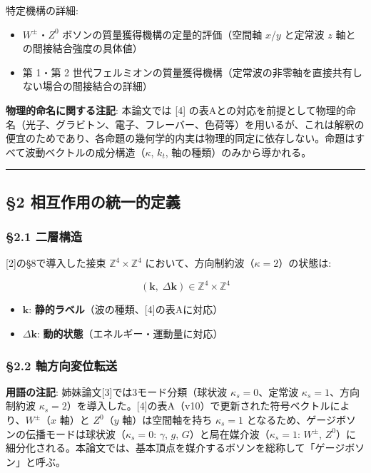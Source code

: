 \documentclass[
  a4paper,11pt]{ltjsarticle}
\providecommand{\tightlist}{%
  \setlength{\itemsep}{0pt}\setlength{\parskip}{0pt}}
\theoremstyle{definition}
\theoremstyle{remark}
\begin{document}
特定機構の詳細:

\begin{itemize}
\tightlist
\item
  \(W^{\pm}\)・\(Z^0\) ボソンの質量獲得機構の定量的評価（空間軸
  \(x\)/\(y\) と定常波 \(z\) 軸との間接結合強度の具体値）
\item
  第 1・第 2
  世代フェルミオンの質量獲得機構（定常波の非零軸を直接共有しない場合の間接結合の詳細）
\end{itemize}

\textbf{物理的命名に関する注記}: 本論文では {[}4{]}
の表Aとの対応を前提として物理的命名（光子、グラビトン、電子、フレーバー、色荷等）を用いるが、これは解釈の便宜のためであり、各命題の幾何学的内実は物理的同定に依存しない。命題はすべて波動ベクトルの成分構造（\(\kappa\),
\(k_t\), 軸の種類）のみから導かれる。

\begin{center}\rule{0.5\linewidth}{0.5pt}\end{center}

\subsection{§2
相互作用の統一的定義}\label{ux76f8ux4e92ux4f5cux7528ux306eux7d71ux4e00ux7684ux5b9aux7fa9}

\subsubsection{§2.1 二層構造}\label{ux4e8cux5c64ux69cbux9020}

{[}2{]}の§8で導入した接束 \(\mathbb{Z}^4 \times \mathbb{Z}^4\)
において、方向制約波（\(\kappa = 2\)）の状態は:

\[(\mathbf{k},\; \Delta\mathbf{k}) \in \mathbb{Z}^4 \times \mathbb{Z}^4\]

\begin{itemize}
\tightlist
\item
  \(\mathbf{k}\): \textbf{静的ラベル}（波の種類、{[}4{]}の表Aに対応）
\item
  \(\Delta\mathbf{k}\): \textbf{動的状態}（エネルギー・運動量に対応）
\end{itemize}

\subsubsection{§2.2
軸方向変位転送}\label{ux8ef8ux65b9ux5411ux5909ux4f4dux8ee2ux9001}

\textbf{用語の注記}: 姉妹論文{[}3{]}では3モード分類（球状波
\(\kappa_s = 0\)、定常波 \(\kappa_s = 1\)、方向制約波
\(\kappa_s = 2\)）を導入した。{[}4{]}の表A（v10）で更新された符号ベクトルにより、\(W^{\pm}\)（\(x\)
軸）と \(Z^0\)（\(y\) 軸）は空間軸を持ち \(\kappa_s = 1\)
となるため、ゲージボソンの伝播モードは球状波（\(\kappa_s = 0\):
\(\gamma\), \(g\), \(G\)）と局在媒介波（\(\kappa_s = 1\): \(W^{\pm}\),
\(Z^0\)）に細分化される。本論文では、基本頂点を媒介するボソンを総称して「ゲージボソン」と呼ぶ。
\end{document}
